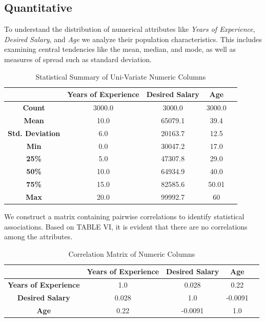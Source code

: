 \documentclass[journal]{IEEEtai}
\begin{document}
\subsection{Quantitative}
To understand the distribution of numerical attributes like {\it Years of Experience}, {\it Desired Salary}, and {\it Age} we analyze their population characteristics. This includes examining central tendencies like the mean, median, and mode, as well as measures of spread such as standard deviation.

\begin{table}[htbp]
  \centering
  \caption{Statistical Summary of Uni-Variate Numeric Columns}
    \begin{tabular}{c c c c c}
      \hline
       & \textbf{Years of Experience} & \textbf{Desired Salary} & \textbf{Age} \\
      \hline
      \textbf{Count} & 3000.0 & 3000.0 & 3000.0 \\
      \textbf{Mean} & 10.0 & 65079.1 & 39.4  \\
      \textbf{Std. Deviation} & 6.0 & 20163.7 & 12.5 \\
      \textbf{Min} & 0.0 & 30047.2 & 17.0 \\
      \textbf{25\%} & 5.0 & 47307.8 & 29.0  \\
      \textbf{50\%} & 10.0 & 64934.9 & 40.0 \\
       \textbf{75\%} & 15.0 & 82585.6 & 50.01 \\
      \textbf{Max} & 20.0 & 99992.7 & 60 \\
      \hline
    \end{tabular}
\end{table}

We construct a matrix containing pairwise correlations to identify statistical associations. Based on TABLE VI, it is evident that there are no correlations among the attributes.

\begin{table}[htbp]
  \centering
  \caption{Correlation Matrix of Numeric Columns}
    \begin{tabular}{c c c c c}
      \hline
       & \textbf{Years of Experience} & \textbf{Desired Salary} & \textbf{Age} \\
      \hline
      \textbf{Years of Experience} & 1.0 & 0.028 & 0.22 \\
      \textbf{Desired Salary} & 0.028 & 1.0 & -0.0091  \\
      \textbf{Age} & 0.22 & -0.0091 & 1.0 \\
      \hline
    \end{tabular}
\end{table}
\end{document}
